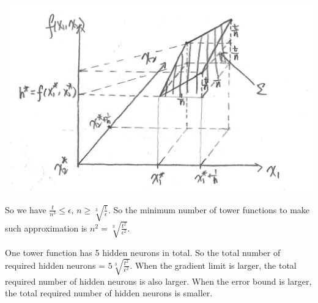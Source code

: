 \documentclass[paper=letter, fontsize=12pt]{article}
\begin{document}
\begin{enumerate}[label=(\alph*)]
	\includegraphics[scale=0.3]{q12c.png}
	
	So we have $\frac{t}{n^3} \leq \epsilon$, $n \geq \sqrt[3]{\frac{t}{\epsilon}}$. So the minimum number of tower functions to make such approximation is $n^2 = \sqrt[3]{\frac{t^2}{\epsilon^2}}$.
	
	One tower function has 5 hidden neurons in total. So the total number of required hidden neurons = $5 \sqrt[3]{\frac{t^2}{\epsilon^2}}$. When the gradient limit is larger, the total required number of hidden neurons is also larger. When the error bound is larger, the total required number of hidden neurons is smaller.
	
\end{enumerate}
\end{document}
